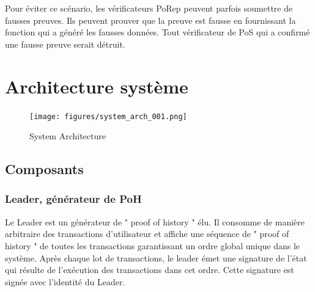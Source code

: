\documentclass[12pt]{article}
\begin{document}
Pour éviter ce scénario, les vérificateurs PoRep peuvent parfois soumettre de fausses preuves. Ils peuvent prouver que la preuve est fausse en fournissant la fonction qui a généré les fausses données. Tout vérificateur de PoS qui a confirmé une fausse preuve serait détruit.

\section{Architecture système}\label{system_architecture}

\begin{figure}
  \begin{center}
    \centering
    \texttt{[image: figures/system\_arch\_001.png]}
    \caption[Fig 9]{System Architecture \label{fig_9}}
  \end{center}
  \end{figure}

\subsection{Composants}

\subsubsection{Leader, générateur de PoH}
Le Leader est un générateur de " proof of history " élu. Il consomme de manière arbitraire des transactions d’utilisateur et affiche une séquence de " proof of history " de toutes les transactions garantissant un ordre global unique dans le système. Après chaque lot de transactions, le leader émet une signature de l'état qui résulte de l'exécution des transactions dans cet ordre. Cette signature est signée avec l'identité du Leader.
\end{document}
